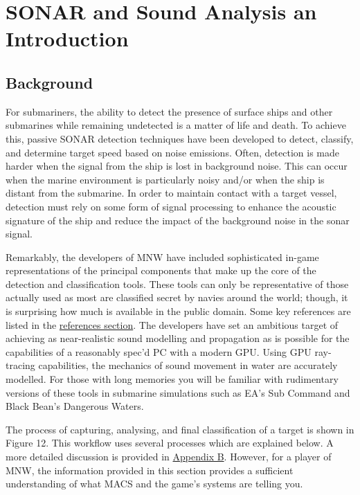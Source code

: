 

\section{SONAR and Sound Analysis an Introduction}

\subsection{Background}

For submariners, the ability to detect the presence of surface ships and other submarines while remaining undetected is a matter of life and death. To achieve this, passive SONAR detection techniques have been developed to detect, classify, and determine target speed based on noise emissions. Often, detection is made harder when the signal from the ship is lost in background noise. This can occur when the marine environment is particularly noisy and/or when the ship is distant from the submarine. In order to maintain contact with a target vessel, detection must rely on some form of signal processing to enhance the acoustic signature of the ship and reduce the impact of the background noise in the sonar signal.

Remarkably, the developers of MNW have included sophisticated in-game representations of the principal components that make up the core of the detection and classification tools. These tools can only be representative of those actually used as most are classified secret by navies around the world; though, it is surprising how much is available in the public domain. Some key references are listed in the \hyperref[sec:References]{references section}. The developers have set an ambitious target of achieving as near-realistic sound modelling and propagation as is possible for the capabilities of a reasonably spec'd PC with a modern GPU. Using GPU ray-tracing capabilities, the mechanics of sound movement in water are accurately modelled. For those with long memories you will be familiar with rudimentary versions of these tools in submarine simulations such as EA's Sub Command and Black Bean's Dangerous Waters.

The process of capturing, analysing, and final classification of a target is shown in Figure 12. This workflow uses several processes which are explained below. A more detailed discussion is provided in \hyperref[sec:Appendix_B]{Appendix B}. However, for a player of MNW, the information provided in this section provides a sufficient understanding of what MACS and the game's systems are telling you.

